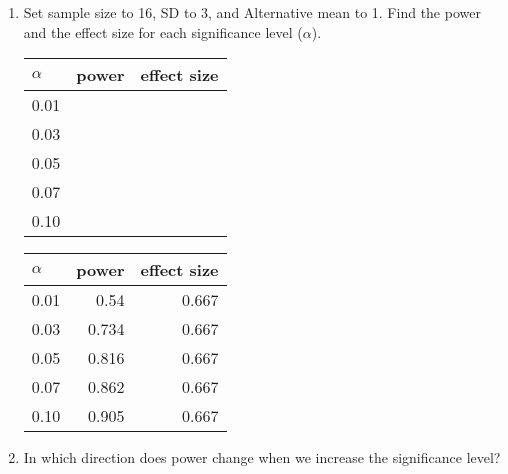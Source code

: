 \begin{enumerate}
\begin{key}
  {\it     Larger effect for same SD means more power, lower SD for same
    effect means more power.  In general, larger effect and lower
    SD means more power. A given effect size has the same power (for
    fixed $n$) no matter what SD and Alternative Mean we have.}
\end{key}


\begin{center}
  {\bf Try different significance levels.}
\end{center}

  \item  Set sample size to 16, SD to 3, and
    Alternative mean to 1. Find the power and the effect size for
    each significance level ($\alpha$).\\ 
\begin{students}\hline
  \begin{tabular}{ |l|r|r|}\hline
    $\alpha$ & power& effect size\\ \hline
    {\large 0.01} && \\ \hline
    {\large 0.03} &&\\ \hline
    {\large 0.05} &&\\ \hline
    {\large 0.07} &&\\ \hline
    {\large 0.10} &&\\ \hline
  \end{tabular}
\end{students}

\begin{key}
  \begin{tabular}{ |l|r|r|}\hline
    $\alpha$ & power& effect size\\ \hline
    {\large 0.01}&0.54 & 0.667\\ \hline
    {\large 0.03}&0.734 &0.667\\ \hline
    {\large 0.05}&0.816 &0.667\\ \hline
    {\large 0.07}&0.862 &0.667\\ \hline
    {\large 0.10}&0.905 &0.667\\ \hline
  \end{tabular}
\end{key}

  \item    In which direction does power change when we increase the
    significance level?  
\begin{students}
 \vspace{3cm}
\end{students}


\end{enumerate}
